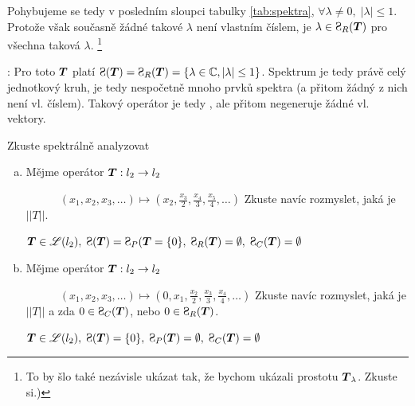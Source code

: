 {Pohybujeme se tedy v posledním sloupci tabulky \ref{tab:spektra}, $\forall \lambda \neq0,\; |\lambda|\leq1$. Protože však současně žádné takové $\lambda$ není vlastním číslem, je $\lambda \in \Sp_R(\map T)$ pro všechna taková $\lambda$. \footnote{To by šlo také nezávisle ukázat tak, že bychom ukázali prostotu $\boldsymbol{T}_\lambda$. Zkuste si.)}

: Pro toto $\boldsymbol{T}$ platí $\Sp(\map T)=\Sp_R(\map T)=\{ \lambda\in\C,|\lambda|\leq1\}$. Spektrum je tedy právě celý jednotkový kruh, je tedy nespočetně mnoho prvků spektra (a přitom žádný z nich není vl. číslem). Takový operátor je tedy , ale přitom negeneruje žádné vl. vektory.
}

\newpage
\Cviceni

Zkuste spektrálně analyzovat
\begin{enumerate}[a)]
\item Mějme operátor $\boldsymbol{T}: l_2\rightarrow l_2$

      $\quad\qquad (x_1,x_2,x_3,\dots)\mapsto \left(x_2,\frac{x_3}{2},\frac{x_4}{3},\frac{x_5}{4},\dots\right)$
      Zkuste navíc rozmyslet, jaká je $||T||$.
      
      
    \textcolor{gray}{ $\map T\in \lin(l_2), \; \Sp(\map T)=\Sp_P(\map T=\{0\},\; \Sp_R(\map T)=\emptyset,\; \Sp_C(\map T)=\emptyset $}
   
   \item Mějme operátor $\boldsymbol{T}: l_2\rightarrow l_2$

      $\quad\qquad (x_1,x_2,x_3,\dots)\mapsto \left(0,x_1,\frac{x_2}{2},\frac{x_3}{3},\frac{x_4}{4},\dots\right)$
Zkuste navíc rozmyslet, jaká je $||T||$ a zda $0\in \Sp_C(\map T)$, nebo $0\in \Sp_R(\map T)$.
      
      
    \textcolor{gray}{ $\map T\in \lin(l_2), \; \Sp(\map T)=\{0\},\; \Sp_P(\map T)=\emptyset,\; \Sp_C(\map T)=\emptyset $}
\end{enumerate}







\pagebreak